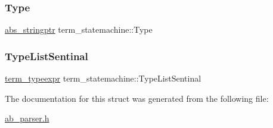 \mbox{\label{structterm__statemachine_abec84e1fd19f32bad850cbbfeb8c187c}} 
\subsubsection{\texorpdfstring{Type}{Type}}
{\footnotesize\ttfamily \hyperlink{structabs__stringptr}{abs\+\_\+stringptr} term\+\_\+statemachine\+::\+Type}

\mbox{\label{structterm__statemachine_ababd4f7bc69e5ca15fe95a56cdb312af}} 
\subsubsection{\texorpdfstring{Type\+List\+Sentinal}{TypeListSentinal}}
{\footnotesize\ttfamily \hyperlink{structterm__typeexpr}{term\+\_\+typeexpr} term\+\_\+statemachine\+::\+Type\+List\+Sentinal}



The documentation for this struct was generated from the following file\+:\begin{DoxyCompactItemize}
\item 
\hyperlink{ab__parser_8h}{ab\+\_\+parser.\+h}\end{DoxyCompactItemize}
